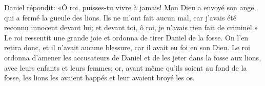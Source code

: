Daniel répondit: «Ô roi, puisses-tu vivre à jamais!
	Mon Dieu a envoyé son ange, qui a fermé la gueule des lions.
Ils ne m’ont fait aucun mal, car j’avais été reconnu innocent devant lui;
	et devant toi, ô roi, je n’avais rien fait de criminel.»
Le roi ressentit une grande joie et ordonna de tirer Daniel de la fosse.
On l’en retira donc, et il n’avait aucune blessure, car il avait eu foi en son Dieu.
Le roi ordonna d’amener les accusateurs de Daniel
	et de les jeter dans la fosse aux lions, avec leurs enfants et leurs femmes;
	or, avant même qu’ils soient au fond de la fosse,
	les lions les avaient happés et leur avaient broyé les os.
